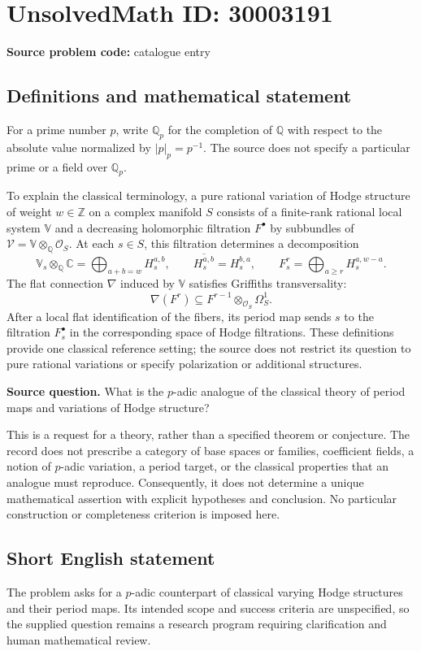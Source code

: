 \documentclass[11pt]{article}
\newcommand{\Z}{\mathbb{Z}}
\newcommand{\Q}{\mathbb{Q}}
\newcommand{\C}{\mathbb{C}}
\begin{document}
\section*{UnsolvedMath ID: 30003191}
\textbf{Source problem code:} catalogue entry
\subsection{Definitions and mathematical statement}
For a prime number \(p\), write \(\Q_p\) for the completion of \(\Q\) with respect to the absolute value normalized by \(|p|_p=p^{-1}\). The source does not specify a particular prime or a field over \(\Q_p\).

To explain the classical terminology, a pure rational variation of Hodge structure of weight \(w\in\Z\) on a complex manifold \(S\) consists of a finite-rank rational local system \(\mathbb V\) and a decreasing holomorphic filtration \(F^\bullet\) by subbundles of \(\mathcal V=\mathbb V\otimes_{\Q}\mathcal O_S\). At each \(s\in S\), this filtration determines a decomposition
\[
\mathbb V_s\otimes_{\Q}\C=\bigoplus_{a+b=w}H_s^{a,b},\qquad
\overline{H_s^{a,b}}=H_s^{b,a},\qquad
F_s^r=\bigoplus_{a\ge r}H_s^{a,w-a}.
\]
The flat connection \(\nabla\) induced by \(\mathbb V\) satisfies Griffiths transversality:
\[
\nabla(F^r)\subseteq F^{r-1}\otimes_{\mathcal O_S}\Omega_S^1.
\]
After a local flat identification of the fibers, its period map sends \(s\) to the filtration \(F_s^\bullet\) in the corresponding space of Hodge filtrations. These definitions provide one classical reference setting; the source does not restrict its question to pure rational variations or specify polarization or additional structures.

\textbf{Source question.} What is the \(p\)-adic analogue of the classical theory of period maps and variations of Hodge structure?

This is a request for a theory, rather than a specified theorem or conjecture. The record does not prescribe a category of base spaces or families, coefficient fields, a notion of \(p\)-adic variation, a period target, or the classical properties that an analogue must reproduce. Consequently, it does not determine a unique mathematical assertion with explicit hypotheses and conclusion. No particular construction or completeness criterion is imposed here.
\subsection{Short English statement}
The problem asks for a \(p\)-adic counterpart of classical varying Hodge structures and their period maps. Its intended scope and success criteria are unspecified, so the supplied question remains a research program requiring clarification and human mathematical review.
\end{document}
